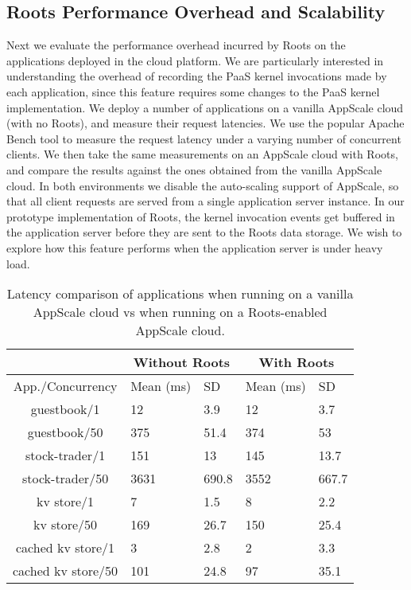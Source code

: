 \subsection{Roots Performance Overhead and Scalability}
Next we evaluate the performance overhead incurred by Roots on the applications deployed in the 
cloud platform. We are particularly interested in understanding the overhead of recording the PaaS kernel
invocations made by each application, since this feature requires some changes to the PaaS kernel
implementation. 
We deploy a number of applications on a vanilla
AppScale cloud (with no Roots), and measure their request latencies. We use
the popular Apache Bench tool to measure the request latency under a
varying number of concurrent clients. We then take the same measurements
on an AppScale cloud with Roots, and compare the results against the ones obtained
from the vanilla AppScale cloud. In both environments we disable the auto-scaling
support of AppScale, so that all client requests are served from a single application
server instance. In our prototype implementation of Roots, the kernel invocation events get buffered in
the application server before they are sent to the Roots data storage. We wish to
explore how this feature performs when the application server is under heavy load.

\begin{table}
\begin{center}
\begin{tabular}{|c|p{0.8cm}|p{0.8cm}|p{0.8cm}|p{0.8cm}|}
\hline &
      \multicolumn{2}{c|}{Without Roots} &
      \multicolumn{2}{c|}{With Roots} \\ \hline
    App./Concurrency & Mean (ms) & SD & Mean (ms) & SD\\

\hline
guestbook/1 & 12 & 3.9 & 12 & 3.7 \\ \hline
guestbook/50 & 375 & 51.4 & 374 & 53 \\ \hline
stock-trader/1 & 151 & 13 & 145 & 13.7 \\ \hline
stock-trader/50 & 3631 & 690.8 & 3552 & 667.7 \\ \hline
kv store/1 & 7 & 1.5 & 8 & 2.2 \\ \hline
kv store/50 & 169 & 26.7  & 150 & 25.4  \\ \hline
cached kv store/1 & 3 & 2.8 & 2 & 3.3 \\ \hline
cached kv store/50 & 101 & 24.8 & 97 & 35.1  \\ \hline
\end{tabular}
\end{center}
\caption{Latency comparison of applications when running on
a vanilla AppScale cloud vs when running on a Roots-enabled
AppScale cloud.
\label{tab:perf_overhead}
}
\end{table}

